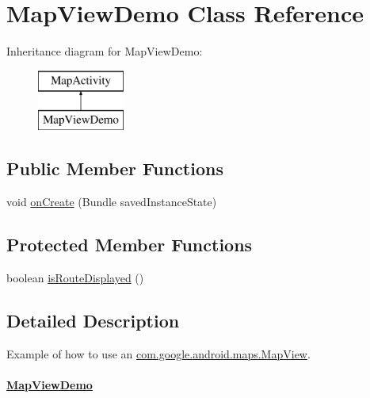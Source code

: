\hypertarget{classcom_1_1example_1_1android_1_1apis_1_1view_1_1_map_view_demo}{\section{Map\-View\-Demo Class Reference}
\label{classcom_1_1example_1_1android_1_1apis_1_1view_1_1_map_view_demo}
}
Inheritance diagram for Map\-View\-Demo\-:\begin{figure}[H]
\begin{center}
\leavevmode
\includegraphics[height=2.000000cm]{classcom_1_1example_1_1android_1_1apis_1_1view_1_1_map_view_demo}
\end{center}
\end{figure}
\subsection*{Public Member Functions}
\begin{DoxyCompactItemize}
\item 
void \hyperlink{classcom_1_1example_1_1android_1_1apis_1_1view_1_1_map_view_demo_a85e87cb5ced88dff7c8173ecc4f636d1}{on\-Create} (Bundle saved\-Instance\-State)
\end{DoxyCompactItemize}
\subsection*{Protected Member Functions}
\begin{DoxyCompactItemize}
\item 
boolean \hyperlink{classcom_1_1example_1_1android_1_1apis_1_1view_1_1_map_view_demo_a294a4986d39cff22365b36850bb2a0ca}{is\-Route\-Displayed} ()
\end{DoxyCompactItemize}


\subsection{Detailed Description}
Example of how to use an \hyperlink{}{com.\-google.\-android.\-maps.\-Map\-View}. \paragraph*{\hyperlink{classcom_1_1example_1_1android_1_1apis_1_1view_1_1_map_view_demo}{Map\-View\-Demo}}

